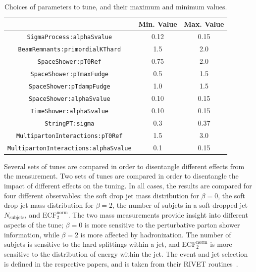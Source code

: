 \begin{table}[ht!]
\caption{Choices of parameters to tune, and their maximum and minimum values.}
\centering\begin{tabular}{ | c | | c | c | } \hline
                                     & Min. Value   & Max. Value    \\ \hline
\texttt{SigmaProcess:alphaSvalue}             &  0.12        & 0.15    \\ \hline
\texttt{BeamRemnants:primordialKThard}        &  1.5         & 2.0     \\ \hline
\texttt{SpaceShower:pT0Ref}                   &  0.75        & 2.0     \\ \hline
\texttt{SpaceShower:pTmaxFudge}               &  0.5         & 1.5     \\ \hline
\texttt{SpaceShower:pTdampFudge}              &  1.0         & 1.5     \\ \hline
\texttt{SpaceShower:alphaSvalue}              &  0.10        & 0.15    \\ \hline
\texttt{TimeShower:alphaSvalue}               &  0.10        & 0.15    \\ \hline
\texttt{StringPT:sigma}                       &  0.3         & 0.37    \\ \hline
\texttt{MultipartonInteractions:pT0Ref}       &  1.5         & 3.0     \\ \hline
\texttt{MultipartonInteractions:alphaSvalue}  &  0.1         & 0.15    \\ \hline
\end{tabular}
\label{tab:parameterSpace}
\end{table}

Several sets of tunes are compared in order to disentangle different effects from the measurement. 
Two sets of tunes are compared in order to disentangle the impact of different effects on the tuning.
In all cases, the results are compared for four different observables:
the soft drop jet mass distribution for $\beta=0$, the soft drop jet mass distribution for $\beta=2$, 
the number of subjets in a soft-dropped jet $N_{\mathrm{subjets}}$, and $\mathrm{ECF}_2^{\mathrm{norm}}$.
The two mass measurements provide insight into different aspects of the tune; $\beta=0$ is more sensitive to the perturbative parton shower information, 
while $\beta=2$ is more affected by hadronization. The number of subjets is sensitive to the hard splittings within a jet, and $\mathrm{ECF}_2^{\mathrm{norm}}$ is more sensitive to the 
distribution of energy within the jet. The event and jet selection is defined in the respective papers, and is taken from their RIVET routines~\cite{Buckley:2010ar}.

